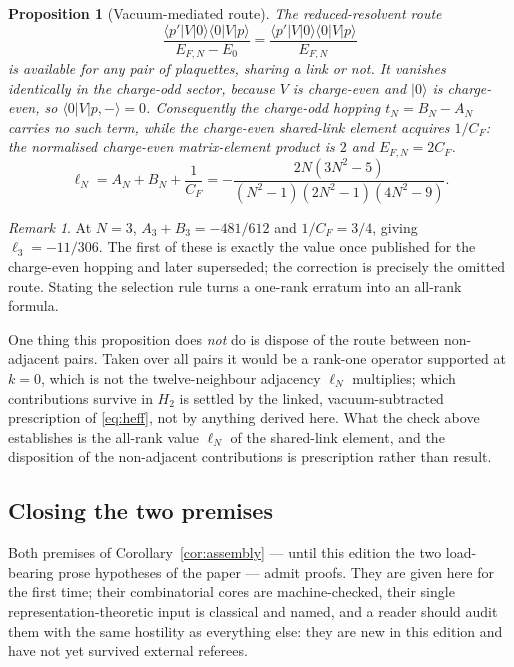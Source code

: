 \documentclass[11pt]{article}
\theoremstyle{plain}
\newtheorem{proposition}[theorem]{Proposition}
\theoremstyle{definition}
\theoremstyle{remark}
\newtheorem{remark}[theorem]{Remark}
\newcommand{\chk}[1]{}
\newcommand{\CF}{C_F}
\begin{document}
\begin{proposition}[Vacuum-mediated route]\label{prop:vacuum}
The reduced-resolvent route
\[
 \frac{\langle p'|V|0\rangle\langle 0|V|p\rangle}{E_{F,N}-E_0}
 =\frac{\langle p'|V|0\rangle\langle 0|V|p\rangle}{E_{F,N}}
\]
is available for any
pair of plaquettes, sharing a link or not. It vanishes identically in the
charge-odd sector, because $V$ is charge-even and $|0\rangle$ is charge-even,
so $\langle0|V|p,-\rangle=0$. Consequently the charge-odd hopping
$t_N=B_N-A_N$ carries no such term, while the charge-even shared-link element
acquires $1/\CF$: the normalised charge-even matrix-element product is $2$
and $E_{F,N}=2\CF$.
\[
  \ell_N=A_N+B_N+\frac1{\CF}
  =-\frac{2N(3N^2-5)}{(N^2-1)(2N^2-1)(4N^2-9)} .
\]
\end{proposition}
\chk{ell\_N = A\_N + B\_N + 1/C\_F, the vacuum-mediated route at every rank}

\begin{remark}
At $N=3$, $A_3+B_3=-481/612$ and $1/\CF=3/4$, giving $\ell_3=-11/306$. The
first of these is exactly the value once published for the charge-even hopping
and later superseded; the correction is precisely the omitted route. Stating
the selection rule turns a one-rank erratum into an all-rank formula.

One thing this proposition does \emph{not} do is dispose of the route between
non-adjacent pairs. Taken over all pairs it would be a rank-one operator
supported at $k=0$, which is not the twelve-neighbour adjacency $\ell_N$
multiplies; which contributions survive in $H_2$ is settled by the linked,
vacuum-subtracted prescription of \eqref{eq:heff}, not by anything derived
here. What the check above establishes is the all-rank value $\ell_N$ of the
shared-link element, and the disposition of the non-adjacent contributions is
prescription rather than result.
\end{remark}

\subsection{Closing the two premises}
\label{sec:closing}

Both premises of Corollary~\ref{cor:assembly} --- until this edition the two
load-bearing prose hypotheses of the paper --- admit proofs. They are given
here for the first time; their combinatorial cores are machine-checked, their
single representation-theoretic input is classical and named, and a reader
should audit them with the same hostility as everything else: they are new
in this edition and have not yet survived external referees.
\end{document}
